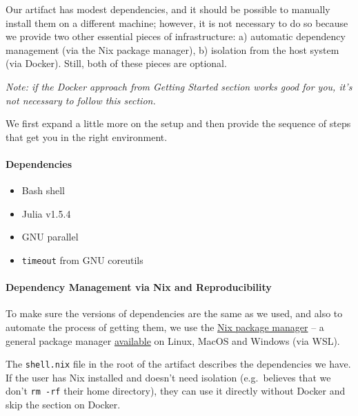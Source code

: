 \documentclass[
]{article}
\begin{document}
Our artifact has modest dependencies, and it should be possible to
manually install them on a different machine; however, it is not necessary
to do so because we provide two other essential
pieces of infrastructure: a) automatic dependency management (via the
Nix package manager), b) isolation from the host system (via Docker).
Still, both of these pieces are optional.

\textit{Note: if the Docker approach from Getting Started section works good for
you, it's not necessary to follow this section.}

We first expand a little more on the setup and then provide the sequence
of steps that get you in the right environment.

\hypertarget{dependencies}{%
\paragraph{Dependencies}\label{dependencies}}

\begin{itemize}
\item
  Bash shell
\item
  Julia v1.5.4
\item
  GNU parallel
\item
  \texttt{timeout} from GNU coreutils
\end{itemize}

\hypertarget{dependency-management-via-nix-and-reproducibility}{%
\paragraph{Dependency Management via Nix and
Reproducibility}\label{dependency-management-via-nix-and-reproducibility}}

To make sure the versions of dependencies are the same as we used, and
also to automate the process of getting them, we use the
\href{https://nixos.org/manual/nix/stable/\#chap-introduction}{Nix
package manager} -- a general package manager
\href{https://nixos.org/guides/install-nix.html}{available} on Linux,
MacOS and Windows (via WSL).

The \texttt{shell.nix} file in the root of the artifact describes the
dependencies we have. If the user has Nix installed and doesn't need
isolation (e.g.~believes that we don't \texttt{rm\ -rf} their home
directory), they can use it directly without Docker and skip the
section on Docker.
\end{document}

